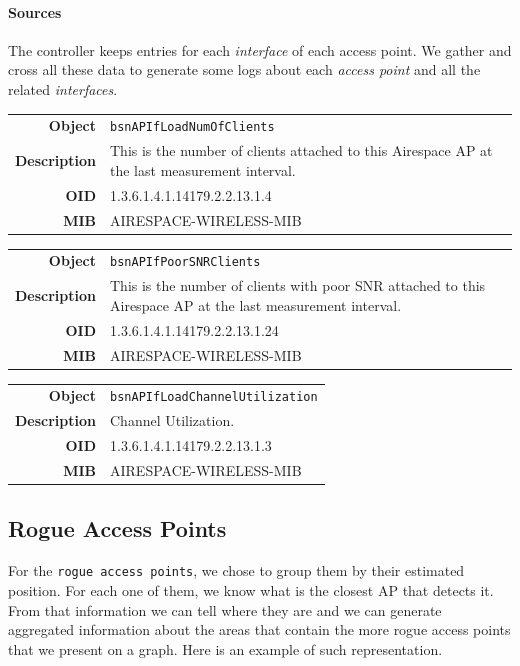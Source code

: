 \paragraph*{Sources} The controller keeps entries for each \emph{interface} of each access point. We gather and cross all these data to generate some logs about each \emph{access point} and all the related \emph{interfaces}.

\begin{tabular}{|r l|}
\hline
\textbf{Object} & \texttt{bsnAPIfLoadNumOfClients} \\
\textbf{Description} & \parbox{11cm}{This is the number of clients attached to this Airespace AP at the last measurement interval.} \\
\textbf{OID} & 1.3.6.1.4.1.14179.2.2.13.1.4 \\
\textbf{MIB} & AIRESPACE-WIRELESS-MIB \\
\hline
\end{tabular}

\begin{tabular}{|r l|}
\hline
\textbf{Object} & \texttt{bsnAPIfPoorSNRClients} \\
\textbf{Description} & \parbox{11cm}{This is the number of clients with poor SNR attached to this Airespace AP at the last measurement interval.} \\
\textbf{OID} & 1.3.6.1.4.1.14179.2.2.13.1.24 \\
\textbf{MIB} & AIRESPACE-WIRELESS-MIB \\
\hline
\end{tabular}

\begin{tabular}{|r l|}
\hline
\textbf{Object} & \texttt{bsnAPIfLoadChannelUtilization} \\
\textbf{Description} & \parbox{11cm}{Channel Utilization.} \\
\textbf{OID} & 1.3.6.1.4.1.14179.2.2.13.1.3 \\
\textbf{MIB} & AIRESPACE-WIRELESS-MIB \\
\hline
\end{tabular}

\subsection{Rogue Access Points}
For the \texttt{rogue access points}, we chose to group them by their estimated position. For each one of them, we know what is the closest AP that detects it. From that information we can tell where they are and we can generate aggregated information about the areas that contain the more rogue access points that we present on a graph. Here is an example of such representation.

